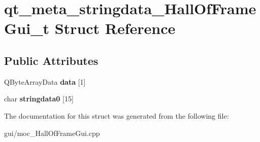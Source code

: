 \hypertarget{structqt__meta__stringdata___hall_of_frame_gui__t}{}\section{qt\+\_\+meta\+\_\+stringdata\+\_\+\+Hall\+Of\+Frame\+Gui\+\_\+t Struct Reference}
\label{structqt__meta__stringdata___hall_of_frame_gui__t}
\subsection*{Public Attributes}
\begin{DoxyCompactItemize}
\item 
\mbox{\label{structqt__meta__stringdata___hall_of_frame_gui__t_ac3b0622a55267305a0a160b9e1461858}} 
Q\+Byte\+Array\+Data {\bfseries data} \mbox{[}1\mbox{]}
\item 
\mbox{\label{structqt__meta__stringdata___hall_of_frame_gui__t_a1004ed59145c29fa77e91e0d02e5a7ea}} 
char {\bfseries stringdata0} \mbox{[}15\mbox{]}
\end{DoxyCompactItemize}


The documentation for this struct was generated from the following file\+:\begin{DoxyCompactItemize}
\item 
gui/moc\+\_\+\+Hall\+Of\+Frame\+Gui.\+cpp\end{DoxyCompactItemize}
